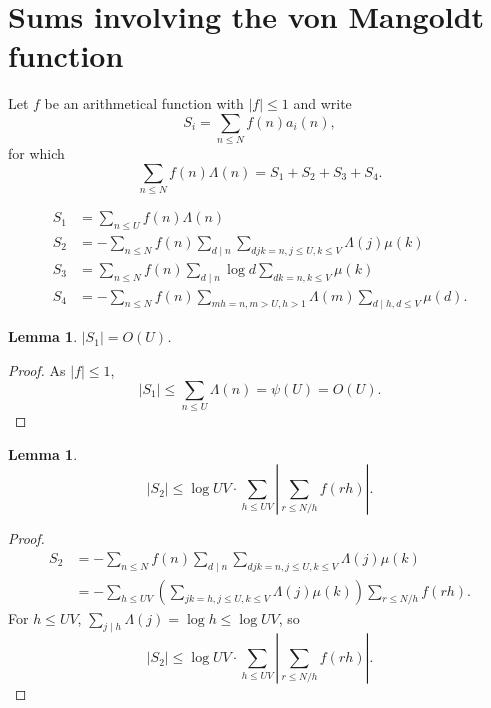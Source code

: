 \documentclass{article}
\newtheorem{lemma}[theorem]{Lemma}
\theoremstyle{definition}
\begin{document}
\section{Sums involving the von Mangoldt function}
Let $f$ be an arithmetical function with $|f| \leq 1$ and 
write
\[
S_i = \sum_{n \leq N} f(n) a_i(n),
\]
for which
\[
\sum_{n \leq N} f(n) \Lambda(n) = S_1+ S_2 + S_3 + S_4.
\]


\begin{align*}
S_1&=\sum_{n \leq U} f(n) \Lambda(n)\\
S_2&= - \sum_{n \leq N} f(n) \sum_{d \mid n} \sum_{djk = n, j \leq U, k \leq V} \Lambda(j) \mu(k)\\
S_3&= \sum_{n \leq N} f(n) \sum_{d \mid n} \log d \sum_{dk=n, k \leq V} \mu(k)\\
S_4&=- \sum_{n \leq N}f(n) \sum_{mh=n, m>U, h>1} \Lambda(m) \sum_{d \mid h, d \leq V} \mu(d).
\end{align*}





\begin{lemma}
$|S_1| = O(U)$.
\end{lemma}
\begin{proof}
As $|f| \leq 1$,
\[
|S_1| \leq \sum_{n \leq U} \Lambda(n) = \psi(U) = O(U).
\]
\end{proof}



\begin{lemma}
\[
|S_2| \leq \log UV \cdot  \sum_{h \leq UV} \left| \sum_{r \leq N/h} f(rh) \right|.
\]
\end{lemma}
\begin{proof}
\begin{align*}
S_2 &=-\sum_{n \leq N} f(n) \sum_{d \mid n} \sum_{djk=n, j \leq U, k \leq V} \Lambda(j) \mu(k)\\
&=-\sum_{h \leq UV} \left( \sum_{jk=h, j \leq U, k \leq V} \Lambda(j) \mu(k) \right) \sum_{r \leq N/h} f(rh).
\end{align*}
For $h \leq UV$, $\sum_{j \mid h} \Lambda(j) = \log h \leq \log UV$, so
\[
|S_2| \leq \log UV \cdot  \sum_{h \leq UV} \left| \sum_{r \leq N/h} f(rh) \right|.
\]
\end{proof}
\end{document}
